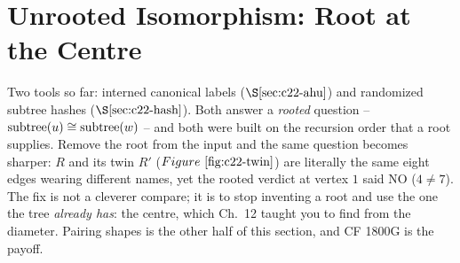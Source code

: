 \section{Unrooted Isomorphism: Root at the Centre}\label{sec:c22-centre}

\begin{previouslybox}
Two tools so far: interned canonical labels (\(\secref{c22-ahu}\)) and randomized
subtree hashes (\(\secref{c22-hash}\)).  Both answer a \emph{rooted} question --
\(\operatorname{subtree}(u)\cong\operatorname{subtree}(w)\) -- and both were built on the recursion order that
a root supplies.  Remove the root from the input and the same question becomes
sharper: \(R\) and its twin \(R'\) (\(\figref{c22-twin}\)) are literally the same
eight edges wearing different names, yet the rooted verdict at vertex \(1\) said NO
(\(4\neq7\)).  The fix is not a cleverer compare; it is to stop inventing a root
and use the one the tree \emph{already has}: the centre, which Ch.~12 taught you
to find from the diameter.  Pairing shapes is the other half of this section, and
CF 1800G is the payoff.
\end{previouslybox}

